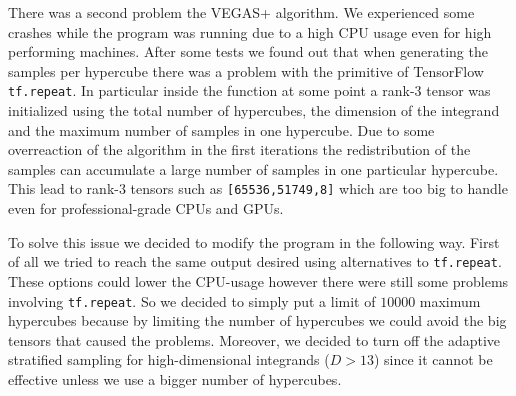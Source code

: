 \documentclass[../main/main.tex]{subfiles}
\begin{document}
There was a second problem the VEGAS+ algorithm.
We experienced some crashes while the program was running due to a high CPU usage even for high performing machines. After some tests we found out that when generating the samples per hypercube there was a problem with the primitive of TensorFlow \texttt{tf.repeat}. In particular inside the function at some point a rank-3 tensor was initialized using the total number of hypercubes, the dimension of the integrand and the maximum number of samples in one hypercube. Due to some overreaction of the algorithm in the first iterations the redistribution of the samples can accumulate a large number of samples in one particular hypercube. This lead to rank-3 tensors such as \texttt{[65536,51749,8]} which are too big to handle even for professional-grade CPUs and GPUs.

To solve this issue we decided to modify the program in the following way.
First of all we tried to reach the same output desired using alternatives to \texttt{tf.repeat}. These options could lower the CPU-usage however there were still some problems involving \texttt{tf.repeat}. So we decided to simply put a limit of $10000$ maximum hypercubes because by limiting the number of hypercubes we could avoid the big tensors that caused the problems.
Moreover,  we decided to turn off the adaptive stratified sampling for high-dimensional integrands ($D > 13$) since it cannot be effective unless we use a bigger number of hypercubes.
\end{document}
